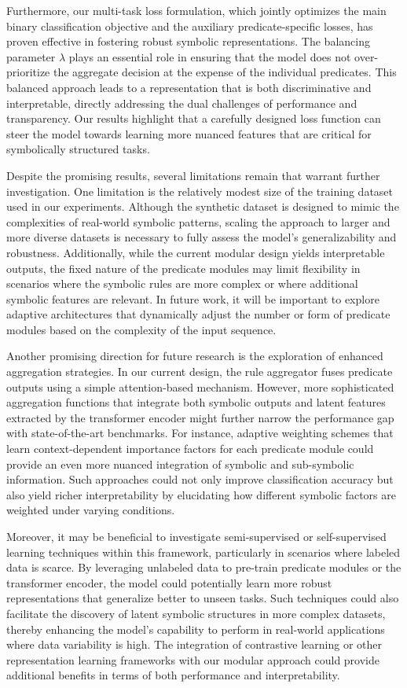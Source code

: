 \documentclass{article}
\begin{document}
Furthermore, our multi-task loss formulation, which jointly optimizes the main binary classification objective and the auxiliary predicate-specific losses, has proven effective in fostering robust symbolic representations. The balancing parameter \(\lambda\) plays an essential role in ensuring that the model does not over-prioritize the aggregate decision at the expense of the individual predicates. This balanced approach leads to a representation that is both discriminative and interpretable, directly addressing the dual challenges of performance and transparency. Our results highlight that a carefully designed loss function can steer the model towards learning more nuanced features that are critical for symbolically structured tasks.

Despite the promising results, several limitations remain that warrant further investigation. One limitation is the relatively modest size of the training dataset used in our experiments. Although the synthetic dataset is designed to mimic the complexities of real-world symbolic patterns, scaling the approach to larger and more diverse datasets is necessary to fully assess the model's generalizability and robustness. Additionally, while the current modular design yields interpretable outputs, the fixed nature of the predicate modules may limit flexibility in scenarios where the symbolic rules are more complex or where additional symbolic features are relevant. In future work, it will be important to explore adaptive architectures that dynamically adjust the number or form of predicate modules based on the complexity of the input sequence.

Another promising direction for future research is the exploration of enhanced aggregation strategies. In our current design, the rule aggregator fuses predicate outputs using a simple attention-based mechanism. However, more sophisticated aggregation functions that integrate both symbolic outputs and latent features extracted by the transformer encoder might further narrow the performance gap with state-of-the-art benchmarks. For instance, adaptive weighting schemes that learn context-dependent importance factors for each predicate module could provide an even more nuanced integration of symbolic and sub-symbolic information. Such approaches could not only improve classification accuracy but also yield richer interpretability by elucidating how different symbolic factors are weighted under varying conditions.

Moreover, it may be beneficial to investigate semi-supervised or self-supervised learning techniques within this framework, particularly in scenarios where labeled data is scarce. By leveraging unlabeled data to pre-train predicate modules or the transformer encoder, the model could potentially learn more robust representations that generalize better to unseen tasks. Such techniques could also facilitate the discovery of latent symbolic structures in more complex datasets, thereby enhancing the model's capability to perform in real-world applications where data variability is high. The integration of contrastive learning or other representation learning frameworks with our modular approach could provide additional benefits in terms of both performance and interpretability.
\end{document}
